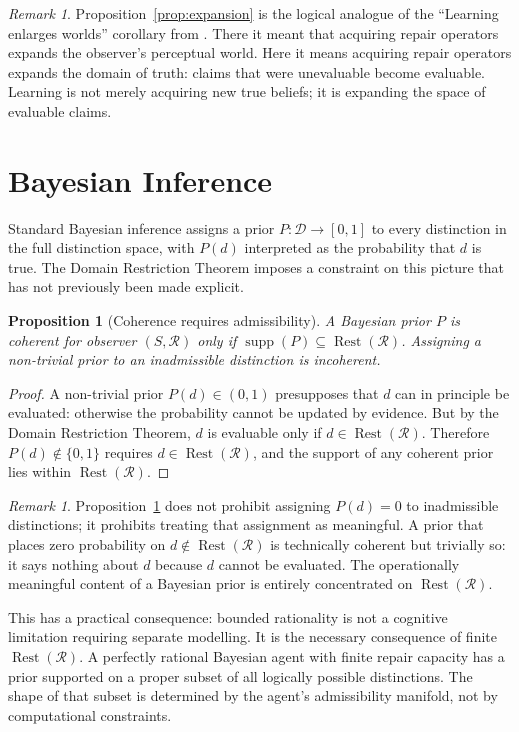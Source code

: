 \documentclass[12pt, oneside]{article}
\theoremstyle{plain}
\newtheorem{proposition}[theorem]{Proposition}
\theoremstyle{definition}
\theoremstyle{remark}
\newtheorem{remark}[theorem]{Remark}
\DeclareMathOperator{\Rest}{Rest}
\newcommand{\Dsub}{\mathcal{D}}
\newcommand{\RestR}{\Rest(\mathcal{R})}
\begin{document}
\begin{remark}
  Proposition~\ref{prop:expansion} is the logical analogue of
  the ``Learning enlarges worlds'' corollary from
  \cite{Flyxion2026a}.
  There it meant that acquiring repair operators expands the
  observer's perceptual world.
  Here it means acquiring repair operators expands the domain of
  truth: claims that were unevaluable become evaluable.
  Learning is not merely acquiring new true beliefs; it is
  expanding the space of evaluable claims.
\end{remark}


\section{Bayesian Inference}
\label{sec:bayes}

Standard Bayesian inference assigns a prior $P: \Dsub \to [0,1]$
to every distinction in the full distinction space, with
$P(d)$ interpreted as the probability that $d$ is true.
The Domain Restriction Theorem imposes a constraint on this picture
that has not previously been made explicit.

\begin{proposition}[Coherence requires admissibility]
  A Bayesian prior $P$ is coherent for observer $(S, \mathcal{R})$
  only if $\operatorname{supp}(P) \subseteq \RestR$.
  Assigning a non-trivial prior to an inadmissible distinction is
  incoherent.
  \label{prop:bayes}
\end{proposition}

\begin{proof}
  A non-trivial prior $P(d) \in (0,1)$ presupposes that $d$ can
  in principle be evaluated: otherwise the probability cannot be
  updated by evidence.
  But by the Domain Restriction Theorem, $d$ is evaluable only if
  $d \in \RestR$.
  Therefore $P(d) \notin \{0, 1\}$ requires $d \in \RestR$, and
  the support of any coherent prior lies within $\RestR$.
\end{proof}

\begin{remark}
  Proposition~\ref{prop:bayes} does not prohibit assigning $P(d)=0$
  to inadmissible distinctions; it prohibits treating that
  assignment as meaningful.
  A prior that places zero probability on $d \notin \RestR$ is
  technically coherent but trivially so: it says nothing about $d$
  because $d$ cannot be evaluated.
  The operationally meaningful content of a Bayesian prior is
  entirely concentrated on $\RestR$.

  This has a practical consequence: bounded rationality is not a
  cognitive limitation requiring separate modelling.
  It is the necessary consequence of finite $\RestR$.
  A perfectly rational Bayesian agent with finite repair capacity
  has a prior supported on a proper subset of all logically possible
  distinctions.
  The shape of that subset is determined by the agent's admissibility
  manifold, not by computational constraints.
\end{remark}
\end{document}

